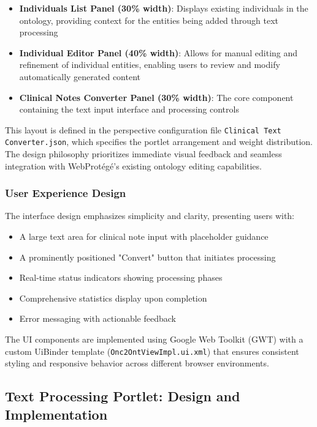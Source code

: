 \begin{itemize}
\item \textbf{Individuals List Panel (30\% width)}: Displays existing individuals in the ontology, providing context for the entities being added through text processing
\item \textbf{Individual Editor Panel (40\% width)}: Allows for manual editing and refinement of individual entities, enabling users to review and modify automatically generated content
\item \textbf{Clinical Notes Converter Panel (30\% width)}: The core component containing the text input interface and processing controls
\end{itemize}

This layout is defined in the perspective configuration file \texttt{Clinical Text Converter.json}, which specifies the portlet arrangement and weight distribution. The design philosophy prioritizes immediate visual feedback and seamless integration with WebProtégé's existing ontology editing capabilities.

\subsubsection{User Experience Design}

The interface design emphasizes simplicity and clarity, presenting users with:

\begin{itemize}
\item A large text area for clinical note input with placeholder guidance
\item A prominently positioned "Convert" button that initiates processing
\item Real-time status indicators showing processing phases
\item Comprehensive statistics display upon completion
\item Error messaging with actionable feedback
\end{itemize}

The UI components are implemented using Google Web Toolkit (GWT) with a custom UiBinder template (\texttt{Onc2OntViewImpl.ui.xml}) that ensures consistent styling and responsive behavior across different browser environments.

\subsection{Text Processing Portlet: Design and Implementation}

